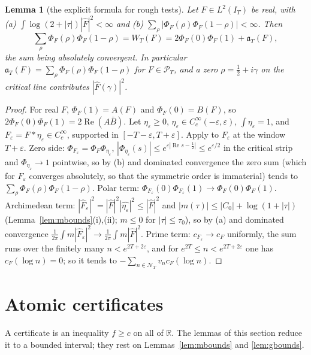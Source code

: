 \documentclass[10pt]{amsart}
\newtheorem{lemma}[theorem]{Lemma}
\theoremstyle{definition}
\theoremstyle{remark}
\newcommand{\R}{\mathbb R}
\newcommand{\Rel}{\operatorname{Re}}
\newcommand{\PT}{\mathcal P_T}
\newcommand{\IT}{I_T}
\newcommand{\Fh}{\widehat F}
\newcommand{\cF}{c_F}
\newcommand{\NT}{\mathcal N_T}
\begin{document}
\begin{lemma}[the explicit formula for rough tests]\label{lem:roughEF}
Let $F\in L^2(\IT)$ be real, with \emph{(a)} $\int\log(2+|\tau|)|\Fh|^2<\infty$ and \emph{(b)}
$\sum_\rho|\Phi_F(\rho)\Phi_F(1-\rho)|<\infty$. Then
\[
\sum_\rho\Phi_F(\rho)\Phi_F(1-\rho)=W_T(F)=2\Phi_F(0)\Phi_F(1)+\mathfrak a_T(F),
\]
the sum being absolutely convergent. In particular $\mathfrak a_T(F)=\sum_\rho\Phi_F(\rho)\Phi_F(1-\rho)$
for $F\in\PT$, and a zero $\rho=\frac12+i\gamma$ on the critical line contributes $|\Fh(\gamma)|^2$.
\end{lemma}
\begin{proof}
For real $F$, $\Phi_F(1)=A(F)$ and $\Phi_F(0)=B(F)$, so $2\Phi_F(0)\Phi_F(1)=2\Rel(A\bar B)$. Let
$\eta_\varepsilon\ge0$, $\eta_\varepsilon\in C_c^\infty(-\varepsilon,\varepsilon)$, $\int\eta_\varepsilon=1$,
and $F_\varepsilon=F*\eta_\varepsilon\in C_c^\infty$, supported in $[-T-\varepsilon,T+\varepsilon]$.
Apply \cite[Theorem~3.3]{Paper45} to $F_\varepsilon$ at the window $T+\varepsilon$. Zero side:
$\Phi_{F_\varepsilon}=\Phi_F\Phi_{\eta_\varepsilon}$, $|\Phi_{\eta_\varepsilon}(s)|\le e^{\varepsilon|\Rel s-\frac12|}\le e^{\varepsilon/2}$
in the critical strip and $\Phi_{\eta_\varepsilon}\to1$ pointwise, so by (b) and dominated convergence
the zero sum (which for $F_\varepsilon$ converges absolutely, so that the symmetric order is
immaterial) tends to $\sum_\rho\Phi_F(\rho)\Phi_F(1-\rho)$. Polar term:
$\Phi_{F_\varepsilon}(0)\Phi_{F_\varepsilon}(1)\to\Phi_F(0)\Phi_F(1)$. Archimedean term:
$|\Fh_\varepsilon|^2=|\Fh|^2|\widehat{\eta_\varepsilon}|^2\le|\Fh|^2$ and $|m(\tau)|\le|C_0|+\log(1+|\tau|)$
(Lemma~\ref{lem:mbounds}(i),(ii); $m\le0$ for $|\tau|\le\tau_0$), so by (a) and dominated convergence
$\frac1{2\pi}\int m|\Fh_\varepsilon|^2\to\frac1{2\pi}\int m|\Fh|^2$. Prime term: $c_{F_\varepsilon}\to\cF$
uniformly, the sum runs over the finitely many $n<e^{2T+2\varepsilon}$, and for
$e^{2T}\le n<e^{2T+2\varepsilon}$ one has $\cF(\log n)=0$; so it tends to $-\sum_{n\in\NT}v_n\cF(\log n)$.
\end{proof}


\section{Atomic certificates}\label{sec:tails}

A certificate is an inequality $f\ge c$ on all of $\R$. The lemmas of this section reduce it to a
bounded interval; they rest on Lemmas~\ref{lem:mbounds} and \ref{lem:gbounds}.
\end{document}
